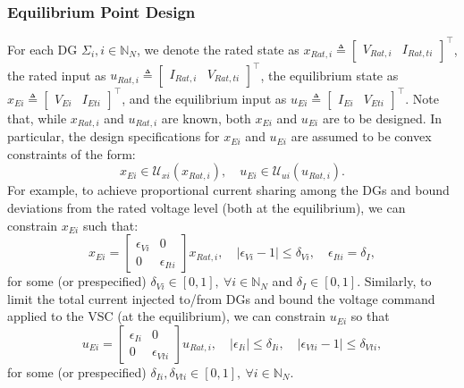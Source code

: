 \documentclass[letterpaper, 10 pt, conference]{ieeeconf}%
\newcommand{\N}{\mathbb{N}}
\newcommand{\T}{\top}
\newcommand{\0}{\mathbf{0}}
\newcommand{\bm}[1]{\begin{bmatrix}#1\end{bmatrix}}
\begin{document}
\subsubsection{\textbf{Equilibrium Point Design}}
For each DG $\Sigma_i, i\in\N_N$, we denote 
the rated state as $x_{Rat,i} \triangleq \bm{V_{Rat,i} & I_{Rat,ti}}^\T$, the rated input as $u_{Rat,i} \triangleq \bm{I_{Rat,i} & V_{Rat,ti}}^\T$, 
the equilibrium state as $x_{Ei} \triangleq \bm{V_{Ei} & I_{Eti}}^\T$, and 
the equilibrium input as $u_{Ei} \triangleq \bm{I_{Ei} & V_{Eti}}^\T$. 
Note that, while $x_{Rat,i}$ and $u_{Rat,i}$ are known, both $x_{Ei}$ and $u_{Ei}$ are to be designed. In particular, the design specifications for $x_{Ei}$ and $u_{Ei}$ are assumed to be convex constraints of the form:
$$
x_{Ei} \in \mathcal{U}_{xi}(x_{Rat,i}), \quad u_{Ei} \in \mathcal{U}_{ui}(u_{Rat,i}).
$$
For example, to achieve proportional current sharing among the DGs and bound deviations from the rated voltage level (both at the equilibrium), we can constrain $x_{Ei}$ such that:
\begin{equation}\label{Eq:DGSpecs1}
x_{Ei} = \bm{\epsilon_{Vi} & 0 \\ 0 & \epsilon_{Iti}} x_{Rat,i}, \quad 
\vert \epsilon_{Vi} - 1 \vert \leq \delta_{Vi},\quad 
\epsilon_{Iti} = \delta_I,
\end{equation}
for some (or prespecified) $\delta_{Vi} \in [0,1],\ \forall i\in\N_N$ and $\delta_I \in [0,1]$. Similarly, to limit the total current injected to/from DGs and bound the voltage command applied to the VSC (at the equilibrium), we can constrain $u_{Ei}$ so that 
\begin{equation}\label{Eq:DGSpecs2}
u_{Ei} = \bm{\epsilon_{Ii} & 0 \\ 0 & \epsilon_{Vti}} u_{Rat,i}, \quad 
\vert \epsilon_{Ii} \vert \leq \delta_{Ii},\quad 
\vert \epsilon_{Vti} - 1 \vert \leq \delta_{Vti},
\end{equation}
for some (or prespecified) $\delta_{Ii}, \delta_{Vti} \in [0,1],\ \forall i\in\N_N$.
\end{document}
